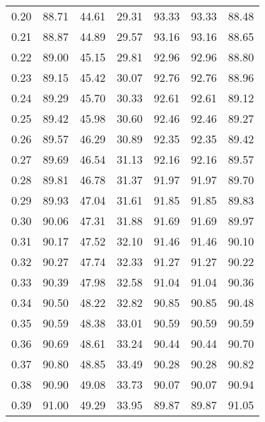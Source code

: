 \begin{tabular}{|c|c|c|c|c|c|c|}
      0.20 &     88.71 &     44.61 &      29.31 &   93.33 &      93.33 &         88.48 \\
      0.21 &     88.87 &     44.89 &      29.57 &   93.16 &      93.16 &         88.65 \\
      0.22 &     89.00 &     45.15 &      29.81 &   92.96 &      92.96 &         88.80 \\
      0.23 &     89.15 &     45.42 &      30.07 &   92.76 &      92.76 &         88.96 \\
      0.24 &     89.29 &     45.70 &      30.33 &   92.61 &      92.61 &         89.12 \\
      0.25 &     89.42 &     45.98 &      30.60 &   92.46 &      92.46 &         89.27 \\
      0.26 &     89.57 &     46.29 &      30.89 &   92.35 &      92.35 &         89.42 \\
      0.27 &     89.69 &     46.54 &      31.13 &   92.16 &      92.16 &         89.57 \\
      0.28 &     89.81 &     46.78 &      31.37 &   91.97 &      91.97 &         89.70 \\
      0.29 &     89.93 &     47.04 &      31.61 &   91.85 &      91.85 &         89.83 \\
      0.30 &     90.06 &     47.31 &      31.88 &   91.69 &      91.69 &         89.97 \\
      0.31 &     90.17 &     47.52 &      32.10 &   91.46 &      91.46 &         90.10 \\
      0.32 &     90.27 &     47.74 &      32.33 &   91.27 &      91.27 &         90.22 \\
      0.33 &     90.39 &     47.98 &      32.58 &   91.04 &      91.04 &         90.36 \\
      0.34 &     90.50 &     48.22 &      32.82 &   90.85 &      90.85 &         90.48 \\
      0.35 &     90.59 &     48.38 &      33.01 &   90.59 &      90.59 &         90.59 \\
      0.36 &     90.69 &     48.61 &      33.24 &   90.44 &      90.44 &         90.70 \\
      0.37 &     90.80 &     48.85 &      33.49 &   90.28 &      90.28 &         90.82 \\
      0.38 &     90.90 &     49.08 &      33.73 &   90.07 &      90.07 &         90.94 \\
      0.39 &     91.00 &     49.29 &      33.95 &   89.87 &      89.87 &         91.05 \\

\end{tabular}
